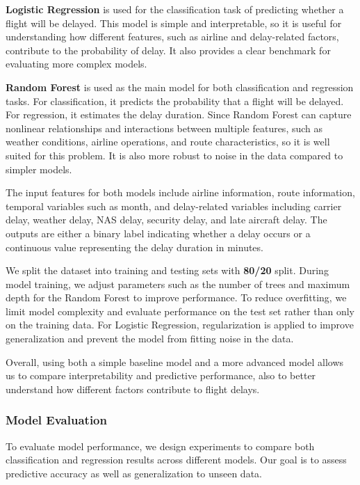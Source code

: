 \textbf{Logistic Regression} is used for the classification task of predicting whether a flight will be delayed. This model is simple and interpretable, so it is useful for understanding how different features, such as airline and delay-related factors, contribute to the probability of delay. It also provides a clear benchmark for evaluating more complex models.

\textbf{Random Forest} is used as the main model for both classification and regression tasks. For classification, it predicts the probability that a flight will be delayed. For regression, it estimates the delay duration. Since Random Forest can capture nonlinear relationships and interactions between multiple features, such as weather conditions, airline operations, and route characteristics, so it is well suited for this problem. It is also more robust to noise in the data compared to simpler models.

The input features for both models include airline information, route information, temporal variables such as month, and delay-related variables including carrier delay, weather delay, NAS delay, security delay, and late aircraft delay. The outputs are either a binary label indicating whether a delay occurs or a continuous value representing the delay duration in minutes.

We split the dataset into training and testing sets with \textbf{80/20} split. During model training, we adjust parameters such as the number of trees and maximum depth for the Random Forest to improve performance. To reduce overfitting, we limit model complexity and evaluate performance on the test set rather than only on the training data. For Logistic Regression, regularization is applied to improve generalization and prevent the model from fitting noise in the data.

Overall, using both a simple baseline model and a more advanced model allows us to compare interpretability and predictive performance, also to better understand how different factors contribute to flight delays.

\subsubsection{Model Evaluation} 

To evaluate model performance, we design experiments to compare both classification and regression results across different models. Our goal is to assess predictive accuracy as well as generalization to unseen data.

